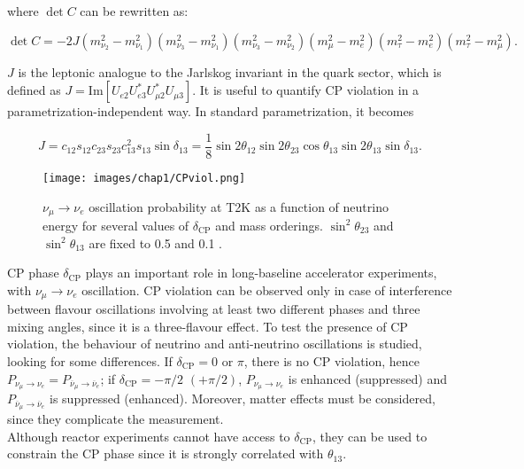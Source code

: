 where $\det C$ can be rewritten as: 

\begin{equation}
    \det C = -2J(m^2_{\nu_2} - m^2_{\nu_1})(m^2_{\nu_3} - m^2_{\nu_1})(m^2_{\nu_3} - m^2_{\nu_2})(m^2_{\mu} - m^2_{e})(m^2_{\tau} - m^2_{e})(m^2_{\tau} - m^2_{\mu}).
\end{equation}

$J$ is the leptonic analogue to the Jarlskog invariant in the quark sector, which is defined as $J = \text{Im}[U_{e2}U^*_{e3}U^*_{\mu2}U_{\mu3}]$. It is useful to quantify CP violation in a parametrization-independent way. In standard parametrization, it becomes

\begin{equation}
    J = c_{12}s_{12}c_{23}s_{23}c^2_{13}s_{13}\sin \delta_{13} = \frac{1}{8}\sin 2\theta_{12}\sin 2\theta_{23} \cos \theta_{13} \sin 2\theta_{13} \sin \delta_{13}.
\end{equation}

\begin{figure}[h!]
    \centering
    \texttt{[image: images/chap1/CPviol.png]}
    \caption{$\nu_\mu \rightarrow \nu_e$ oscillation probability at T2K as a function of neutrino energy for several values of $\delta_{\text{CP}}$ and mass orderings. $\sin^2 \theta_{23}$ and $\sin^2 \theta_{13}$ are fixed to 0.5 and 0.1 \cite{CP-viol-mass-order}.}
    \label{fig:CPviol}
\end{figure}

CP phase $\delta_{\text{CP}}$ plays an important role in long-baseline accelerator experiments, with $\nu_\mu \rightarrow \nu_e$ oscillation. CP violation can be observed only in case of interference between flavour oscillations involving at least two different phases and three mixing angles, since it is a three-flavour effect. To test the presence of CP violation, the behaviour of neutrino and anti-neutrino oscillations is studied, looking for some differences. If $\delta_{\text{CP}} = 0$ or $\pi$, there is no CP violation, hence $P_{\nu_\mu \rightarrow \nu_e} = P_{\overline{\nu}_\mu \rightarrow \overline{\nu}_e}$; if $\delta_{\text{CP}} = -\pi/2$ $(+\pi/2)$, $P_{\nu_\mu \rightarrow \nu_e}$ is enhanced (suppressed) and $P_{\overline{\nu}_\mu \rightarrow \overline{\nu}_e}$ is suppressed (enhanced).
Moreover, matter effects must be considered, since they complicate the measurement. \\
Although reactor experiments cannot have access to $\delta_{\text{CP}}$, they can be used to constrain the CP phase since it is strongly correlated with $\theta_{13}$.

